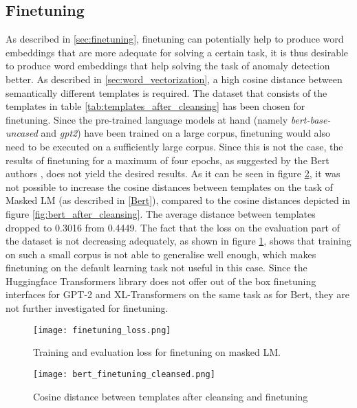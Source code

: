 \subsection{Finetuning}
As described in \ref{sec:finetuning}, finetuning can potentially help to produce word embeddings that are more adequate for solving a certain task, it is thus desirable to produce word embeddings that help solving the task of anomaly detection better. As described in \ref{sec:word_vectorization}, a high cosine distance between semantically different templates is required. The dataset that consists of the templates in table \ref{tab:templates_after_cleansing} has been chosen for finetuning. Since the pre-trained language models at hand (namely \textit{bert-base-uncased} and \textit{gpt2}) have been trained on a large corpus, finetuning would also need to be executed on a sufficiently large corpus. Since this is not the case, the results of finetuning for a maximum of four epochs, as suggested by the Bert authors \cite{devlin2018bert}, does not yield the desired results. As it can be seen in figure \ref{fig:cos_distance_finetuning}, it was not possible to increase the cosine distances between templates on the task of Masked LM (as described in \ref{Bert}), compared to the cosine distances depicted in figure \ref{fig:bert_after_cleansing}. The average distance between templates dropped to 0.3016 from 0.4449. The fact that the loss on the evaluation part of the dataset is not decreasing adequately, as shown in figure \ref{fig:finetuning_loss}, shows that training on such a small corpus is not able to generalise well enough, which makes finetuning on the default learning task not useful in this case. Since the Huggingface Transformers library does not offer out of the box finetuning interfaces for GPT-2 and XL-Transformers on the same task as for Bert, they are not further investigated for finetuning.

\begin{figure}[H]
  \centering
  \texttt{[image: finetuning\_loss.png]}\\
  \caption{Training and evaluation loss for finetuning on masked LM.}
  \label{fig:finetuning_loss}
\end{figure}

\begin{figure}[h]
  \centering
  \texttt{[image: bert\_finetuning\_cleansed.png]}\\
  \caption{Cosine distance between templates after cleansing and finetuning}
  \label{fig:cos_distance_finetuning}
\end{figure}


